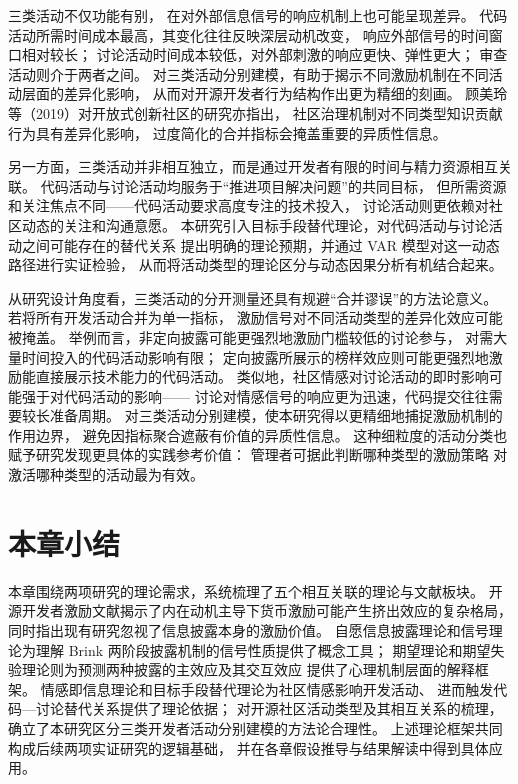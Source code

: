 三类活动不仅功能有别，
在对外部信息信号的响应机制上也可能呈现差异。
代码活动所需时间成本最高，其变化往往反映深层动机改变，
响应外部信号的时间窗口相对较长；
讨论活动时间成本较低，对外部刺激的响应更快、弹性更大；
审查活动则介于两者之间。
对三类活动分别建模，有助于揭示不同激励机制在不同活动层面的差异化影响，
从而对开源开发者行为结构作出更为精细的刻画\cite{schroter2010}。
顾美玲等（2019）对开放式创新社区的研究亦指出，
社区治理机制对不同类型知识贡献行为具有差异化影响，
过度简化的合并指标会掩盖重要的异质性信息\cite{gu2019governance}。

另一方面，三类活动并非相互独立，而是通过开发者有限的时间与精力资源相互关联。
代码活动与讨论活动均服务于“推进项目解决问题”的共同目标，
但所需资源和关注焦点不同——代码活动要求高度专注的技术投入，
讨论活动则更依赖对社区动态的关注和沟通意愿。
本研究引入目标手段替代理论，对代码活动与讨论活动之间可能存在的替代关系
提出明确的理论预期，并通过 VAR 模型对这一动态路径进行实证检验，
从而将活动类型的理论区分与动态因果分析有机结合起来。

从研究设计角度看，三类活动的分开测量还具有规避“合并谬误”的方法论意义。
若将所有开发活动合并为单一指标，
激励信号对不同活动类型的差异化效应可能被掩盖。
举例而言，非定向披露可能更强烈地激励门槛较低的讨论参与，
对需大量时间投入的代码活动影响有限；
定向披露所展示的榜样效应则可能更强烈地激励能直接展示技术能力的代码活动。
类似地，社区情感对讨论活动的即时影响可能强于对代码活动的影响——
讨论对情感信号的响应更为迅速，代码提交往往需要较长准备周期。
对三类活动分别建模，使本研究得以更精细地捕捉激励机制的作用边界，
避免因指标聚合遮蔽有价值的异质性信息。
这种细粒度的活动分类也赋予研究发现更具体的实践参考价值：
管理者可据此判断哪种类型的激励策略
对激活哪种类型的活动最为有效。

\section{本章小结}

本章围绕两项研究的理论需求，系统梳理了五个相互关联的理论与文献板块。
开源开发者激励文献揭示了内在动机主导下货币激励可能产生挤出效应的复杂格局，
同时指出现有研究忽视了信息披露本身的激励价值。
自愿信息披露理论和信号理论为理解 Brink 两阶段披露机制的信号性质提供了概念工具；
期望理论和期望失验理论则为预测两种披露的主效应及其交互效应
提供了心理机制层面的解释框架。
情感即信息理论和目标手段替代理论为社区情感影响开发活动、
进而触发代码—讨论替代关系提供了理论依据；
对开源社区活动类型及其相互关系的梳理，
确立了本研究区分三类开发者活动分别建模的方法论合理性。
上述理论框架共同构成后续两项实证研究的逻辑基础，
并在各章假设推导与结果解读中得到具体应用。


